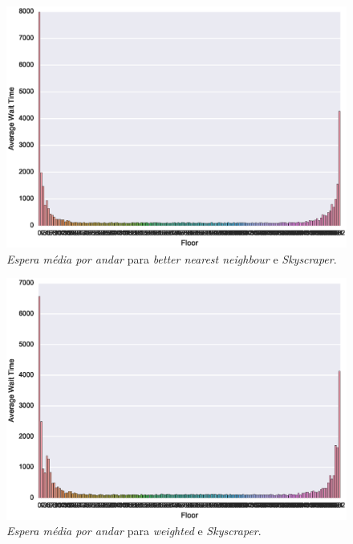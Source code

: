 \begin{figure}[H]
  \centering
  \includegraphics[scale=0.8]{img/results/Skyscraper/3_Simple_BetterNearestNeighbour/averageWaitTime}
  \caption{\textit{Espera média por andar} para \textit{better nearest neighbour} e \textit{Skyscraper}.}
  \label{fig:result:skyscraper:avgwt:bnn}
\end{figure}

\begin{figure}[H]
  \centering
  \includegraphics[scale=0.8]{img/results/Skyscraper/4_Simple_Weighted/averageWaitTime}
  \caption{\textit{Espera média por andar} para \textit{weighted} e \textit{Skyscraper}.}
  \label{fig:result:skyscraper:avgwt:weighted}
\end{figure}

